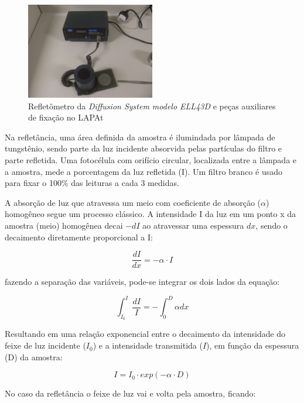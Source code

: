 \begin{figure}[H]
  \centering
  \includegraphics[width=0.5\textwidth]{../inputs/images/refletometro.jpg}
  \caption{Refletômetro da \textit{Diffusion System modelo ELL43D}
           e peças auxiliares de fixação no LAPAt}
\end{figure}

Na refletância, uma área definida da amostra é ilumindada por lâmpada de 
tungstênio, sendo parte da luz incidente absorvida pelas partículas do 
filtro e parte refletida. Uma fotocélula com orifício circular, localizada
entre a lâmpada e a amostra, mede a porcentagem da luz refletida (I).
Um filtro branco é usado para fixar o 100\% das leituras a cada 3 medidas.

A absorção de luz que atravessa um meio com coeficiente de absorção ($\alpha$) 
homogêneo segue um processo clássico. A intensidade I da luz em um ponto x da
amostra (meio) homogênea decai $-dI$ ao atravessar uma espessura $dx$, 
sendo o decaimento diretamente proporcional a I:

\begin{equation}
  \label{eq:dIdx}
   \frac{dI}{dx} = -\alpha \cdot I
\end{equation}

fazendo a separação das variáveis, pode-se integrar os dois lados da equação:

\begin{equation}
  \int_{I_0}^{I} \frac{dI}{I} = - \int_{0}^{D} \alpha dx
\end{equation}

Resultando em uma relação exponencial entre o decaimento da intensidade do feixe
de luz incidente ($I_0$) e a intensidade transmitida ($I$), 
em função da espessura (D) da amostra:

\begin{equation}
  \label{eq:I_BC}
  I = I_0 \cdot exp(-\alpha \cdot D)
\end{equation}

No caso da refletância o feixe de luz vai e volta pela amostra, ficando:

